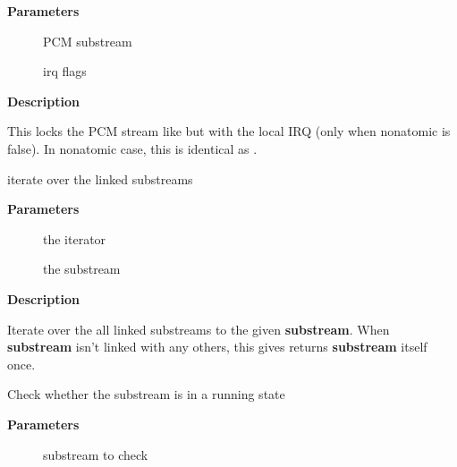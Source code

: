 \documentclass[a4paper,8pt,english]{sphinxmanual}
\begin{document}
\textbf{Parameters}
\begin{description}
\item[{}] \leavevmode
PCM substream

\item[{}] \leavevmode
irq flags

\end{description}

\textbf{Description}

This locks the PCM stream like  but with the local
IRQ (only when nonatomic is false).  In nonatomic case, this is identical
as .

\begin{fulllineitems}
\label{sound/kernel-api/alsa-driver-api:c.snd_pcm_group_for_each_entry}
iterate over the linked substreams

\end{fulllineitems}


\textbf{Parameters}
\begin{description}
\item[{}] \leavevmode
the iterator

\item[{}] \leavevmode
the substream

\end{description}

\textbf{Description}

Iterate over the all linked substreams to the given \textbf{substream}.
When \textbf{substream} isn't linked with any others, this gives returns \textbf{substream}
itself once.

\begin{fulllineitems}
\label{sound/kernel-api/alsa-driver-api:c.snd_pcm_running}
Check whether the substream is in a running state

\end{fulllineitems}


\textbf{Parameters}
\begin{description}
\item[{}] \leavevmode
substream to check

\end{description}
\end{document}
